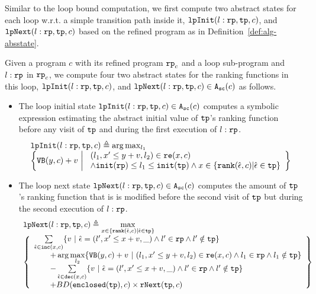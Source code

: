 Similar to the loop bound computation,
we first compute two abstract states for each loop w.r.t. a simple transition path inside it,
$\mathtt{lpInit}(l: \mathtt{rp}, \mathtt{tp}, c)$, and $\mathtt{lpNext}(l: \mathtt{rp}, \mathtt{tp}, c)$ based on the refined program
as in Definition~\ref{def:alg-absstate}.
\begin{defn}
\label{def:alg-loopabsstate}
Given a program $c$ with its refined program $\mathtt{rp}_c$ and a loop sub-program  and $l:\mathtt{rp}$ in $\mathtt{rp}_c$,
we compute four two abstract states for the ranking functions in this loop, 
   $\mathtt{lpInit}(l: \mathtt{rp}, \mathtt{tp}, c)$, and $\mathtt{lpNext}(l: \mathtt{rp}, \mathtt{tp}, c) \in {\ensuremath{\mathtt{A_{sc}}}}(c)$ as follows.
   \begin{itemize}%
   \item 
The loop initial state 
$\mathtt{lpInit}(l: \mathtt{rp}, \mathtt{tp}, c) \in {\ensuremath{\mathtt{A_{sc}}}}(c)$ computes a symbolic expression estimating the abstract initial value of $\mathtt{tp}$'s ranking function before
any visit of $\mathtt{tp}$ and during the first execution of $l: \mathtt{rp}$.
\[
  \begin{array}{l}
    \lpinit(l: \rprog, \tpath, c) \triangleq 
  \arg\max_{l_1}
  \\
  \left\{
       \varinvar(y, c) + v ~\middle\vert~ 
       \begin{array}{l} 
         (l_1, x' \leq y + v, l_2) \in \reset(x, c) 
         \\
         \land \absinit(\rprog) \leq l_1 \leq \absinit(\tpath)
         \land
         x \in \left\{ \locbound(\absevent, c) | \absevent \in \tpath \right\}
       \end{array}
     \right\}
    \end{array}
    \]
\item
The loop next state 
$\mathtt{lpNext}(l: \mathtt{rp}, \mathtt{tp}, c) \in {\ensuremath{\mathtt{A_{sc}}}}(c)$ 
computes the amount of $\mathtt{tp}$'s ranking function
that is is modified before
the second visit of $\mathtt{tp}$ but during the second execution of $l: \mathtt{rp}$.
%
\[
  \begin{array}{l}
  \lpnext(l: \rprog, \tpath, c) \triangleq 
  \max\limits_{x \in \left\{ \locbound(\absevent, c) | \absevent \in \tpath \right\}}
  \\
  \left\{
    \begin{array}{l}
  \sum\limits_{\absevent \in \inc(x, c) }
  \left\{ 
      v ~\middle\vert~ \absevent = (l', x' \leq x + v, \_) \land  l' \in \rprog 
      \land l' \notin \tpath \right\}
      \\ \qquad 
      + \arg\max\limits_{l_2 }
         \left\{ \varinvar(y, c) + v ~\middle\vert~ 
         (l_1, x' \leq y + v, l_2) \in \reset(x, c) \land l_1 \in \rprog \land l_1 \notin \tpath\right\}
     \\ \qquad 
      - \sum\limits_{ \absevent \in \dec(x, c) }\left\{ 
      v 
      ~\middle\vert~ \absevent = (l', x' \leq x + v, \_) \land l' \in \rprog \land l' \notin \tpath \right\}
      \\ \qquad 
      + BD(\kw{enclosed}(\tpath), c) \times \rfnext(\tpath, c)
    \end{array}
    \right\}
  \end{array}
  \]
    \end{itemize}
\end{defn}
